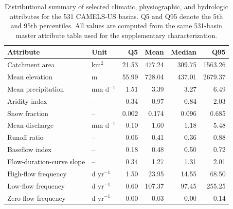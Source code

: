 
\begin{table}[htbp]
\centering
\caption{Distributional summary of selected climatic, physiographic, and hydrologic attributes for the 531 CAMELS-US basins. Q5 and Q95 denote the 5th and 95th percentiles. All values are computed from the same 531-basin master attribute table used for the supplementary characterization.}
\label{tab:camels_attribute_summary}
\begin{tabular}{llrrrr}
\toprule
Attribute & Unit & Q5 & Mean & Median & Q95 \\
\midrule
Catchment area & km$^2$ & 21.53 & 477.24 & 309.75 & 1563.26 \\
Mean elevation & m & 55.99 & 728.04 & 437.01 & 2679.37 \\
Mean precipitation & mm d$^{-1}$ & 1.51 & 3.39 & 3.27 & 6.49 \\
Aridity index & -- & 0.34 & 0.97 & 0.84 & 2.03 \\
Snow fraction & -- & 0.002 & 0.174 & 0.096 & 0.685 \\
Mean discharge & mm d$^{-1}$ & 0.10 & 1.60 & 1.18 & 5.48 \\
Runoff ratio & -- & 0.06 & 0.41 & 0.36 & 0.88 \\
Baseflow index & -- & 0.18 & 0.48 & 0.50 & 0.72 \\
Flow-duration-curve slope & -- & 0.34 & 1.27 & 1.31 & 2.01 \\
High-flow frequency & d yr$^{-1}$ & 1.50 & 23.95 & 14.55 & 68.50 \\
Low-flow frequency & d yr$^{-1}$ & 0.60 & 107.37 & 97.45 & 255.25 \\
Zero-flow frequency & d yr$^{-1}$ & 0.00 & 0.03 & 0.00 & 0.14 \\
\bottomrule
\end{tabular}
\end{table}

